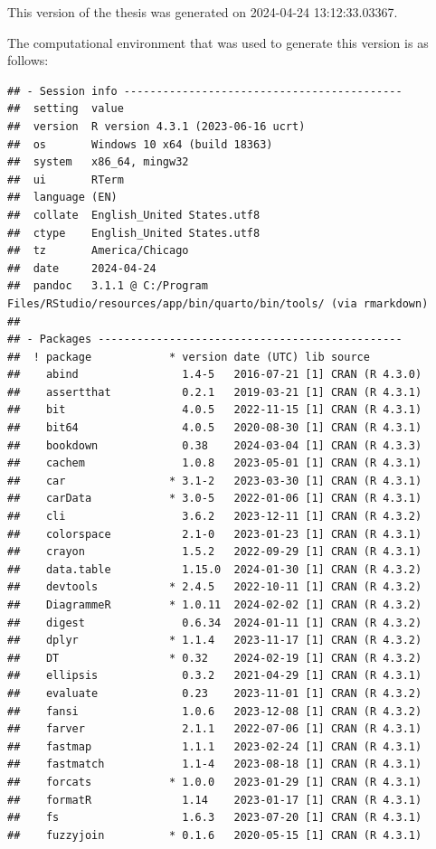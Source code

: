 \documentclass[print]{nuthesis}
\begin{document}
This version of the thesis was generated on 2024-04-24 13:12:33.03367.

The computational environment that was used to generate this version is as follows:

\begin{verbatim}
## - Session info -------------------------------------------
##  setting  value
##  version  R version 4.3.1 (2023-06-16 ucrt)
##  os       Windows 10 x64 (build 18363)
##  system   x86_64, mingw32
##  ui       RTerm
##  language (EN)
##  collate  English_United States.utf8
##  ctype    English_United States.utf8
##  tz       America/Chicago
##  date     2024-04-24
##  pandoc   3.1.1 @ C:/Program Files/RStudio/resources/app/bin/quarto/bin/tools/ (via rmarkdown)
## 
## - Packages -----------------------------------------------
##  ! package            * version date (UTC) lib source
##    abind                1.4-5   2016-07-21 [1] CRAN (R 4.3.0)
##    assertthat           0.2.1   2019-03-21 [1] CRAN (R 4.3.1)
##    bit                  4.0.5   2022-11-15 [1] CRAN (R 4.3.1)
##    bit64                4.0.5   2020-08-30 [1] CRAN (R 4.3.1)
##    bookdown             0.38    2024-03-04 [1] CRAN (R 4.3.3)
##    cachem               1.0.8   2023-05-01 [1] CRAN (R 4.3.1)
##    car                * 3.1-2   2023-03-30 [1] CRAN (R 4.3.1)
##    carData            * 3.0-5   2022-01-06 [1] CRAN (R 4.3.1)
##    cli                  3.6.2   2023-12-11 [1] CRAN (R 4.3.2)
##    colorspace           2.1-0   2023-01-23 [1] CRAN (R 4.3.1)
##    crayon               1.5.2   2022-09-29 [1] CRAN (R 4.3.1)
##    data.table           1.15.0  2024-01-30 [1] CRAN (R 4.3.2)
##    devtools           * 2.4.5   2022-10-11 [1] CRAN (R 4.3.2)
##    DiagrammeR         * 1.0.11  2024-02-02 [1] CRAN (R 4.3.2)
##    digest               0.6.34  2024-01-11 [1] CRAN (R 4.3.2)
##    dplyr              * 1.1.4   2023-11-17 [1] CRAN (R 4.3.2)
##    DT                 * 0.32    2024-02-19 [1] CRAN (R 4.3.2)
##    ellipsis             0.3.2   2021-04-29 [1] CRAN (R 4.3.1)
##    evaluate             0.23    2023-11-01 [1] CRAN (R 4.3.2)
##    fansi                1.0.6   2023-12-08 [1] CRAN (R 4.3.2)
##    farver               2.1.1   2022-07-06 [1] CRAN (R 4.3.1)
##    fastmap              1.1.1   2023-02-24 [1] CRAN (R 4.3.1)
##    fastmatch            1.1-4   2023-08-18 [1] CRAN (R 4.3.1)
##    forcats            * 1.0.0   2023-01-29 [1] CRAN (R 4.3.1)
##    formatR              1.14    2023-01-17 [1] CRAN (R 4.3.1)
##    fs                   1.6.3   2023-07-20 [1] CRAN (R 4.3.1)
##    fuzzyjoin          * 0.1.6   2020-05-15 [1] CRAN (R 4.3.1)

\end{verbatim}
\end{document}
